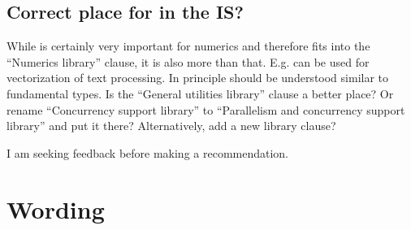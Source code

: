 \subsection{Correct place for  in the IS?}

While  is certainly very important for numerics and therefore fits into the “Numerics library” clause, it is also more than that.
E.g.  can be used for vectorization of text processing.
In principle  should be understood similar to fundamental types.
Is the “General utilities library” clause a better place?
Or rename “Concurrency support library” to “Parallelism and concurrency support library” and put it there?
Alternatively, add a new library clause?

I am seeking feedback before making a recommendation.

\section{Wording}




